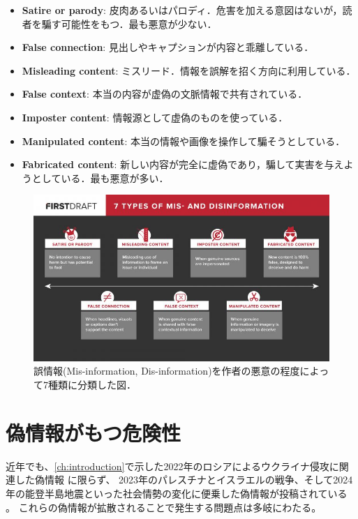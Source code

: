 \begin{itemize}
    \item \textbf{Satire or parody}: 皮肉あるいはパロディ．危害を加える意図はないが，読者を騙す可能性をもつ．最も悪意が少ない．
    \item \textbf{False connection}: 見出しやキャプションが内容と乖離している．
    \item \textbf{Misleading content}: ミスリード．情報を誤解を招く方向に利用している．
    \item \textbf{False context}: 本当の内容が虚偽の文脈情報で共有されている．
    \item \textbf{Imposter content}: 情報源として虚偽のものを使っている．
    \item \textbf{Manipulated content}: 本当の情報や画像を操作して騙そうとしている．
    \item \textbf{Fabricated content}: 新しい内容が完全に虚偽であり，騙して実害を与えようとしている．最も悪意が多い．
\end{itemize}

\begin{figure}[p]
    \includegraphics[width=\linewidth]{figures/fig_types.jpg}
    \caption{誤情報(Mis-information, Dis-information)を作者の悪意の程度によって7種類に分類した図\cite{wardle_2017}．}
    \label{fig:types}
\end{figure}


\section{偽情報がもつ危険性}
近年でも、\cref{ch:introduction}で示した2022年のロシアによるウクライナ侵攻に関連した偽情報 \cite{evon_2022}に限らず、
2023年のパレスチナとイスラエルの戦争、そして2024年の能登半島地震といった社会情勢の変化に便乗した偽情報が投稿されている \cite{Press_2023,noto}。
これらの偽情報が拡散されることで発生する問題点は多岐にわたる。

